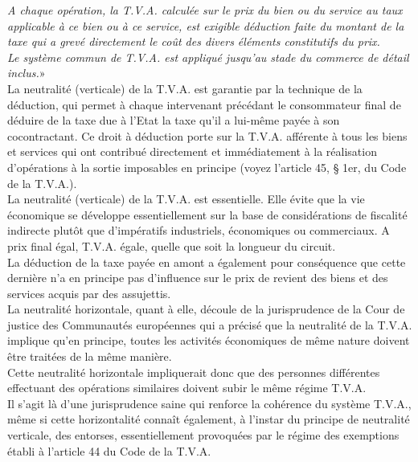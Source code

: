 \documentclass{book}
\begin{document}
\textit{A chaque opération, la T.V.A. calculée sur le prix du bien ou du service au taux applicable à
ce bien ou à ce service, est exigible déduction faite du montant de la taxe qui a grevé
directement le coût des divers éléments constitutifs du prix.}\\

\textit{Le système commun de T.V.A. est appliqué jusqu’au stade du commerce de détail inclus.}»\\

La neutralité (verticale) de la T.V.A. est garantie par la technique de la déduction, qui permet
à chaque intervenant précédant le consommateur final de déduire de la taxe due à l'Etat la taxe
qu'il a lui-même payée à son cocontractant. Ce droit à déduction porte sur la T.V.A. afférente
à tous les biens et services qui ont contribué directement et immédiatement à la réalisation
d'opérations à la sortie imposables en principe (voyez l'article 45, § 1er, du Code de la
T.V.A.).\\

La neutralité (verticale) de la T.V.A. est essentielle. Elle évite que la vie économique se
développe essentiellement sur la base de considérations de fiscalité indirecte plutôt que
d'impératifs industriels, économiques ou commerciaux. A prix final égal, T.V.A. égale,
quelle que soit la longueur du circuit.\\

La déduction de la taxe payée en amont a également pour conséquence que cette dernière n'a
en principe pas d'influence sur le prix de revient des biens et des services acquis par des
assujettis.\\

La neutralité horizontale, quant à elle, découle de la jurisprudence de la Cour de justice des
Communautés européennes qui a précisé que la neutralité de la T.V.A. implique qu’en
principe, toutes les activités économiques de même nature doivent être traitées de la même
manière.\\

Cette neutralité horizontale impliquerait donc que des personnes différentes effectuant des
opérations similaires doivent subir le même régime T.V.A.\\

Il s’agit là d’une jurisprudence saine qui renforce la cohérence du système T.V.A., même si
cette horizontalité connaît également, à l’instar du principe de neutralité verticale, des
entorses, essentiellement provoquées par le régime des exemptions établi à l’article 44 du
Code de la T.V.A.\\
\end{document}

